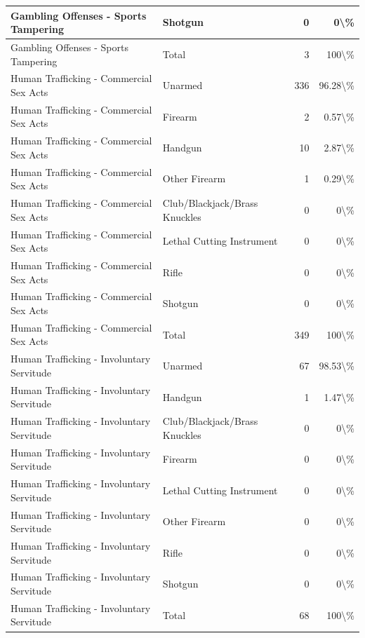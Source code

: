 \documentclass[
]{krantz}
\begin{document}
\begin{longtable}[t]{l|l|r|r}
\hline
Gambling Offenses - Sports Tampering & Shotgun & 0 & 0\textbackslash{}\%\\
\hline
Gambling Offenses - Sports Tampering & Total & 3 & 100\textbackslash{}\%\\
\hline
Human Trafficking - Commercial Sex Acts & Unarmed & 336 & 96.28\textbackslash{}\%\\
\hline
Human Trafficking - Commercial Sex Acts & Firearm & 2 & 0.57\textbackslash{}\%\\
\hline
Human Trafficking - Commercial Sex Acts & Handgun & 10 & 2.87\textbackslash{}\%\\
\hline
Human Trafficking - Commercial Sex Acts & Other Firearm & 1 & 0.29\textbackslash{}\%\\
\hline
Human Trafficking - Commercial Sex Acts & Club/Blackjack/Brass Knuckles & 0 & 0\textbackslash{}\%\\
\hline
Human Trafficking - Commercial Sex Acts & Lethal Cutting Instrument & 0 & 0\textbackslash{}\%\\
\hline
Human Trafficking - Commercial Sex Acts & Rifle & 0 & 0\textbackslash{}\%\\
\hline
Human Trafficking - Commercial Sex Acts & Shotgun & 0 & 0\textbackslash{}\%\\
\hline
Human Trafficking - Commercial Sex Acts & Total & 349 & 100\textbackslash{}\%\\
\hline
Human Trafficking - Involuntary Servitude & Unarmed & 67 & 98.53\textbackslash{}\%\\
\hline
Human Trafficking - Involuntary Servitude & Handgun & 1 & 1.47\textbackslash{}\%\\
\hline
Human Trafficking - Involuntary Servitude & Club/Blackjack/Brass Knuckles & 0 & 0\textbackslash{}\%\\
\hline
Human Trafficking - Involuntary Servitude & Firearm & 0 & 0\textbackslash{}\%\\
\hline
Human Trafficking - Involuntary Servitude & Lethal Cutting Instrument & 0 & 0\textbackslash{}\%\\
\hline
Human Trafficking - Involuntary Servitude & Other Firearm & 0 & 0\textbackslash{}\%\\
\hline
Human Trafficking - Involuntary Servitude & Rifle & 0 & 0\textbackslash{}\%\\
\hline
Human Trafficking - Involuntary Servitude & Shotgun & 0 & 0\textbackslash{}\%\\
\hline
Human Trafficking - Involuntary Servitude & Total & 68 & 100\textbackslash{}\%\\

\end{longtable}
\end{document}

